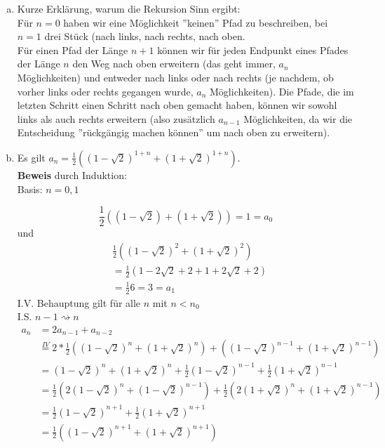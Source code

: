 \documentclass[11pt,a4paper,ngerman]{article}
\begin{document}
\begin{enumerate}[a)]
\item Kurze Erklärung, warum die Rekursion Sinn ergibt: \\
Für $n=0$ haben wir eine Möglichkeit ''keinen'' Pfad zu beschreiben, bei $n=1$ drei Stück (nach links, nach rechts, nach oben. \\
Für einen Pfad der Länge $n+1$ können wir für jeden Endpunkt eines Pfades der Länge $n$ den Weg nach oben erweitern (das geht immer, $a_n$ Möglichkeiten) und entweder nach links oder nach rechts (je nachdem, ob vorher links oder rechts gegangen wurde, $a_n$ Möglichkeiten). Die Pfade, die im letzten Schritt einen Schritt nach oben gemacht haben, können wir sowohl links als auch rechts erweitern (also zusätzlich $a_{n-1}$ Möglichkeiten, da wir die Entscheidung ''rückgängig machen können'' um nach oben zu erweitern).

\item Es gilt $a_n = \frac{1}{2} \left( \left(1-\sqrt{2} \right)^{1+n}+\left(1+\sqrt{2}\right)^{1+n} \right)$. \\
\textbf{Beweis} durch Induktion: \\
Basis: $n = 0,1$

\begin{equation*}
\frac{1}{2} \left((1-\sqrt{2})+(1+\sqrt{2}) \right) = 1 = a_0
\end{equation*}
und
\begin{equation*}\begin{split}
& \frac{1}{2} \left((1-\sqrt{2})^2+(1+\sqrt{2})^2 \right) \\
& = \frac{1}{2} \left(1-2\sqrt{2}+2+1+2\sqrt{2}+2 \right) \\
& = \frac{1}{2} 6 = 3 = a_1
\end{split}\end{equation*}
I.V. Behauptung gilt für alle $n$ mit $n < n_0$ \\
I.S. $n-1 \rightsquigarrow n$ \\
\begin{equation*}\begin{split}
a_{n} &= 2a_{n-1} + a_{n-2} \\
      &\stackrel{IV}{=} 2* \frac{1}{2} \left( \left(1-\sqrt{2} \right)^{n}+\left(1+\sqrt{2}\right)^{n} \right)
        +   \left( \left(1-\sqrt{2} \right)^{n-1}+\left(1+\sqrt{2}\right)^{n-1} \right) \\
      &= \left(1-\sqrt{2} \right)^{n}+\left(1+\sqrt{2}\right)^{n} + \frac{1}{2}\left(1-\sqrt{2} \right)^{n-1}+\frac{1}{2}\left(1+\sqrt{2}\right)^{n-1} \\
      &= \frac{1}{2}\left(2 \left(1-\sqrt{2}\right)^{n} + \left(1-\sqrt{2}\right)^{n-1} \right)
          + \frac{1}{2}\left(2 \left(1+\sqrt{2}\right)^{n} + \left(1+\sqrt{2}\right)^{n-1} \right) \\
      &= \frac{1}{2} \left(1-\sqrt{2} \right)^{n+1}
         + \frac{1}{2} \left(1+\sqrt{2} \right)^{n+1} \\
      &= \frac{1}{2}\left(\left(1-\sqrt{2} \right)^{n+1} +\left(1+\sqrt{2} \right)^{n+1}  \right)
\end{split}\end{equation*}
\end{enumerate}
\end{document}
